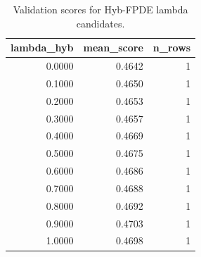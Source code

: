 \begin{table}[t]
\caption{Validation scores for Hyb-FPDE lambda candidates.}
\label{tab:lambda_distribution_computed}
\centering
\begin{tabular}{rrr}
\toprule
lambda\_hyb & mean\_score & n\_rows \\
\midrule
0.0000 & 0.4642 & 1 \\
0.1000 & 0.4650 & 1 \\
0.2000 & 0.4653 & 1 \\
0.3000 & 0.4657 & 1 \\
0.4000 & 0.4669 & 1 \\
0.5000 & 0.4675 & 1 \\
0.6000 & 0.4686 & 1 \\
0.7000 & 0.4688 & 1 \\
0.8000 & 0.4692 & 1 \\
0.9000 & 0.4703 & 1 \\
1.0000 & 0.4698 & 1 \\
\bottomrule
\end{tabular}

\end{table}
